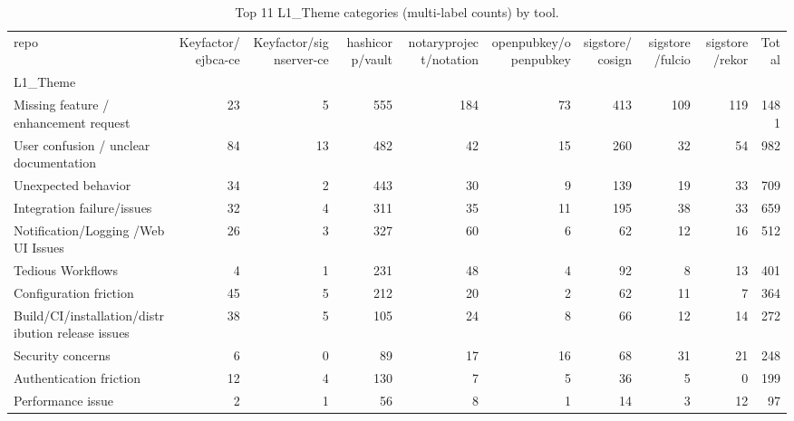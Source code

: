 \begin{table}[t]
\centering
\caption{Top 11 L1_Theme categories (multi-label counts) by tool.}
\label{tab:phase3-l1_theme}
\scriptsize
\begin{tabular}{lrrrrrrrrr}
\toprule
repo & Keyfactor/ejbca-ce & Keyfactor/signserver-ce & hashicorp/vault & notaryproject/notation & openpubkey/openpubkey & sigstore/cosign & sigstore/fulcio & sigstore/rekor & Total \\
L1_Theme &  &  &  &  &  &  &  &  &  \\
\midrule
Missing feature / enhancement request & 23 & 5 & 555 & 184 & 73 & 413 & 109 & 119 & 1481 \\
User confusion / unclear documentation & 84 & 13 & 482 & 42 & 15 & 260 & 32 & 54 & 982 \\
Unexpected behavior & 34 & 2 & 443 & 30 & 9 & 139 & 19 & 33 & 709 \\
Integration failure/issues & 32 & 4 & 311 & 35 & 11 & 195 & 38 & 33 & 659 \\
Notification/Logging /Web UI Issues & 26 & 3 & 327 & 60 & 6 & 62 & 12 & 16 & 512 \\
Tedious Workflows & 4 & 1 & 231 & 48 & 4 & 92 & 8 & 13 & 401 \\
Configuration friction & 45 & 5 & 212 & 20 & 2 & 62 & 11 & 7 & 364 \\
Build/CI/installation/distribution release issues & 38 & 5 & 105 & 24 & 8 & 66 & 12 & 14 & 272 \\
Security concerns & 6 & 0 & 89 & 17 & 16 & 68 & 31 & 21 & 248 \\
Authentication friction & 12 & 4 & 130 & 7 & 5 & 36 & 5 & 0 & 199 \\
Performance issue & 2 & 1 & 56 & 8 & 1 & 14 & 3 & 12 & 97 \\
\bottomrule
\end{tabular}

\end{table}
